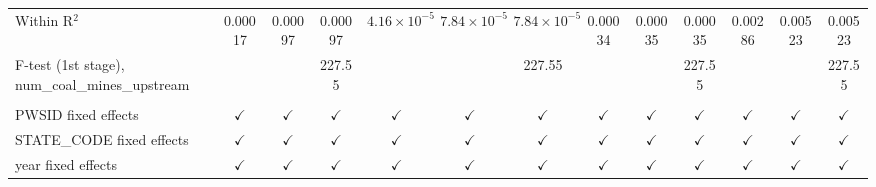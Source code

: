 \begin{table}[htbp]
\begin{adjustbox}{width = \textwidth, center}
\begin{tabular}{lcccccccccccc}
         Within R$^2$                                      & 0.00017       & 0.00097       & 0.00097       & $4.16\times 10^{-5}$  & $7.84\times 10^{-5}$  & $7.84\times 10^{-5}$  & 0.00034       & 0.00035       & 0.00035       & 0.00286       & 0.00523         & 0.00523\\  
         F-test (1st stage), num\_coal\_mines\_upstream    &               &               & 227.55        &                       &                       & 227.55                &               &               & 227.55        &               &                 & 227.55\\  
          \\
         PWSID fixed effects                               & $\checkmark$  & $\checkmark$  & $\checkmark$  & $\checkmark$          & $\checkmark$          & $\checkmark$          & $\checkmark$  & $\checkmark$  & $\checkmark$  & $\checkmark$  & $\checkmark$    & $\checkmark$\\   
         STATE\_CODE fixed effects                         & $\checkmark$  & $\checkmark$  & $\checkmark$  & $\checkmark$          & $\checkmark$          & $\checkmark$          & $\checkmark$  & $\checkmark$  & $\checkmark$  & $\checkmark$  & $\checkmark$    & $\checkmark$\\   
         year fixed effects                                & $\checkmark$  & $\checkmark$  & $\checkmark$  & $\checkmark$          & $\checkmark$          & $\checkmark$          & $\checkmark$  & $\checkmark$  & $\checkmark$  & $\checkmark$  & $\checkmark$    & $\checkmark$\\   
         \bottomrule
      \end{tabular}
   \end{adjustbox}
\end{table}


